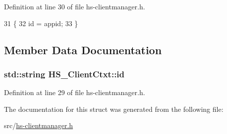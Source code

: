 Definition at line 30 of file hs-\/clientmanager.\+h.


\begin{DoxyCode}
31     \{
32         \textcolor{keywordtype}{id} = appid;
33     \}
\end{DoxyCode}


\subsection{Member Data Documentation}
\subsubsection[{\texorpdfstring{id}{id}}]{\setlength{\rightskip}{0pt plus 5cm}std\+::string H\+S\+\_\+\+Client\+Ctxt\+::id}\hypertarget{struct_h_s___client_ctxt_a04929d7d5f583a821d3d594815f77d1c}{}\label{struct_h_s___client_ctxt_a04929d7d5f583a821d3d594815f77d1c}


Definition at line 29 of file hs-\/clientmanager.\+h.



The documentation for this struct was generated from the following file\+:\begin{DoxyCompactItemize}
\item 
src/\hyperlink{hs-clientmanager_8h}{hs-\/clientmanager.\+h}\end{DoxyCompactItemize}

